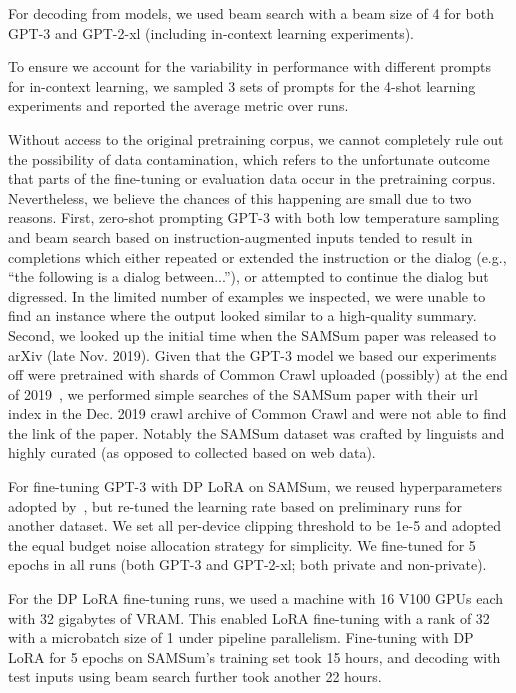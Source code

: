 For decoding from models, we used beam search with a beam size of 4 for both GPT-3 and GPT-2-xl (including in-context learning experiments). 

To ensure we account for the variability in performance with different prompts for in-context learning, we sampled 3 sets of prompts for the 4-shot learning experiments and reported the average metric over runs. 

Without access to the original pretraining corpus, we cannot completely rule out the possibility of data contamination, which refers to the unfortunate outcome that parts of the fine-tuning or evaluation data occur in the pretraining corpus.
Nevertheless, we believe the chances of this happening are small due to two reasons. 
First, zero-shot prompting GPT-3 with both low temperature sampling and beam search based on instruction-augmented inputs tended to result in completions which either repeated or extended the instruction or the dialog (e.g., ``the following is a dialog between...''), or attempted to continue the dialog but digressed. 
In the limited number of examples we inspected, we were unable to find an instance where the output looked similar to a high-quality summary. Second, we looked up the initial time when the SAMSum paper was released to arXiv (late Nov. 2019). 
Given that the GPT-3 model we based our experiments off were pretrained with shards of Common Crawl uploaded (possibly) at the end of 2019~\citep{brown2020language}, we performed simple searches of the SAMSum paper with their url index in the Dec. 2019 crawl archive of Common Crawl and were not able to find the link of the paper.
Notably the SAMSum dataset was crafted by linguists and highly curated (as opposed to collected based on web data). 

For fine-tuning GPT-3 with DP LoRA on SAMSum, we reused hyperparameters adopted by~\cite{hu2021lora}, but re-tuned the learning rate based on preliminary runs for another dataset.
We set all per-device clipping threshold to be 1e-5 and adopted the equal budget noise allocation strategy for simplicity. 
We fine-tuned for 5 epochs in all runs (both GPT-3 and GPT-2-xl; both private and non-private).

For the DP LoRA fine-tuning runs, we used a machine with 16 V100 GPUs each with 32 gigabytes of VRAM. 
This enabled LoRA fine-tuning with a rank of 32 with a microbatch size of 1 under pipeline parallelism.
Fine-tuning with DP LoRA for 5 epochs on SAMSum's training set took 15 hours, and decoding with test inputs using beam search further took another 22 hours. 








